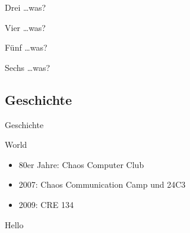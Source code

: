 \documentclass[hyperref={pdfpagelabels=false}]{beamer}
\begin{document}
\begin{frame}[label=secmatetags]{Drei \dots was?}
    \begin{figure}
    \end{figure}
\end{frame}

\begin{frame}[label=secpony]{Vier \dots was?}
    \begin{figure}
    \end{figure}
\end{frame}

\begin{frame}[label=secreprap]{Fünf \dots was?}
    \begin{figure}
    \end{figure}
\end{frame}

\begin{frame}[label=secinvaders]{Sechs \dots was?}
    \begin{figure}
    \end{figure}
\end{frame}

\subsection{Geschichte}

\begin{frame}[label=secgeschichte]{Geschichte}
    \begin{block}{World}
        \begin{itemize}
            \item 80er Jahre: Chaos Computer Club
            \item 2007: Chaos Communication Camp und 24C3
                \cite{Ohlig2007}
            \item 2009: CRE 134 \cite{Pritlove2009}
        \end{itemize}
    \end{block}
    \pause
    \begin{block}{Hello}
        \begin{center}
        \end{center}
    \end{block}
\end{frame}
\end{document}
